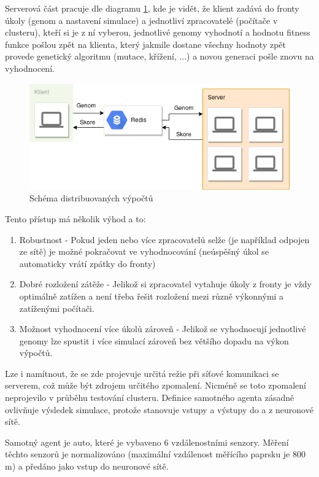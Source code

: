 Serverová část pracuje dle diagramu \ref{fig:distributed}, kde je vidět, že klient zadává do fronty úkoly (genom a nastavení simulace) a jednotliví zpracovatelé (počítače v clusteru), kteří si je z ní vyberou, jednotlivé genomy vyhodnotí a hodnotu fitness funkce pošlou zpět na klienta, který jakmile dostane všechny hodnoty zpět provede genetický algoritmu (mutace, křížení, ...) a novou generaci pošle znovu na vyhodnocení.
\begin{figure}[h!]
	\centering
	\includegraphics[scale=0.5]{distributed}
	\caption[Schéma distribuovaných výpočtů]{Schéma distribuovaných výpočtů}
	\label{fig:distributed}
\end{figure}
Tento přístup má několik výhod a to:
\begin{enumerate}
	\item Robustnost - Pokud jeden nebo více zpracovatelů selže (je například odpojen ze sítě) je možné pokračovat ve vyhodnocování (neúspěšný úkol se automaticky vrátí zpátky do fronty)
	\item Dobré rozložení zátěže - Jelikož si zpracovatel vytahuje úkoly z fronty je vždy optimálně zatížen a není třeba řešit rozložení mezi různě výkonnými a zatíženými počítači.
	\item Možnost vyhodnocení více úkolů zároveň - Jelikož se vyhodnocují jednotlivé genomy lze spustit i více simulací zároveň bez většího dopadu na výkon výpočtů.
\end{enumerate}

Lze i namítnout, že se zde projevuje určitá režie při síťové komunikaci se serverem, což může být zdrojem určitého zpomalení. Nicméně se toto zpomalení neprojevilo v průběhu testování clusteru. 
Definice samotného agenta zásadně ovlivňuje výsledek simulace, protože stanovuje vstupy a výstupy do a z neuronové sítě. 

Samotný agent je auto, které je vybaveno 6 vzdálenostními senzory. Měření těchto senzorů je normalizováno (maximální vzdálenost měřícího paprsku je 800 m) a předáno jako vstup do neuronové sítě.


